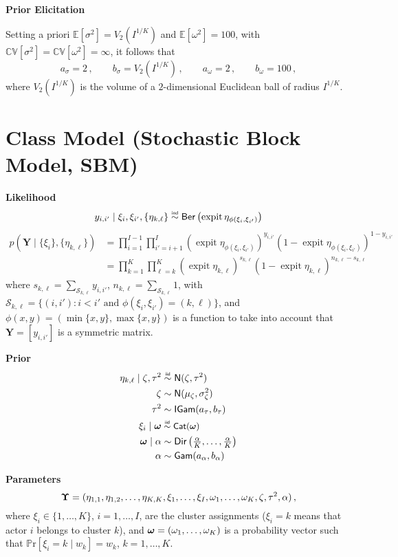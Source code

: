 \documentclass[letterpaper,12pt,openany]{article}
\DeclareMathOperator*{\expit}{expit}
\newcommand\simiid{\mathrel{\overset{\makebox[0pt]{\mbox{\normalfont\tiny\sffamily iid}}}{\sim}}}
\newcommand\simind{\mathrel{\overset{\makebox[0pt]{\mbox{\normalfont\tiny\sffamily ind}}}{\sim}}}
\newcommand{\pr}[1]{\mathbb{P}\text{r}\left[#1\right]}
\newcommand{\expec}[1]{\mathbb{E}\left[#1\right]}
\newcommand{\CV}[1]{\mathbb{C}\mathbb{V}\left[#1\right]}
\def\Cat{\small{\mathsf{Cat}}}
\def\Dir{\small{\mathsf{Dir}}}
\def\Ber{\small{\mathsf{Ber}}}
\def\Nor{\small{\mathsf{N}}}
\def\Gamd{\small{\mathsf{Gam}}}
\def\IGamd{\small{\mathsf{IGam}}}
\def\Y{\mathbf{Y}}\def\y{\mathbf{y}}\def\Yv{\boldsymbol{Y}}\def\yv{\boldsymbol{y}}
\def\al{\alpha}\def\alv{\boldsymbol{\alpha}}
\def\sig{\sigma}\def\sigv{\boldsymbol{\sigma}}
\def\ome{\omega}
\begin{document}
\textbf{Prior Elicitation}

Setting a priori $\expec{\sigma^2} = V_2\left(I^{1/K}\right)$ and $\expec{\omega^2} = 100$, with $\CV{\sigma^2} = \CV{\omega^2} = \infty$, it follows that
$$
a_\sig = 2\,,\qquad b_\sig = V_2\left(I^{1/K}\right)  \,,\qquad a_\ome =2\,,\qquad b_\ome = 100\,,
$$
where $V_2(I^{1/K})$ is the volume of a $2$-dimensional Euclidean ball of radius $I^{1/K}$.
 
\section{Class Model (Stochastic Block Model, SBM)}

\textbf{Likelihood}
$$y_{i,i'}\mid \xi_i,\xi_{i'}, \{\eta_{k,\ell}\} \simind \Ber\left( \expit\eta_{\phi(\xi_i,\xi_{i'})}  \right)$$
\begin{align*}
p(\Y\mid\{\xi_{i}\},\{\eta_{k,\ell}\}) &= \prod_{i=1}^{I-1}\prod_{i'=i+1}^I(\expit \eta_{\phi(\xi_i,\xi_{i'})})^{y_{i,i'}}(1-\expit \eta_{\phi(\xi_i,\xi_{i'})})^{1-y_{i,i'}} \\
&=\prod_{k=1}^{K}\prod_{\ell=k}^K (\expit \eta_{k,\ell})^{s_{k,\ell}}(1-\expit \eta_{k,\ell})^{n_{k,\ell}-s_{k,\ell}}
\end{align*}
where $s_{k,\ell} = \sum_{\mathcal{S}_{k,\ell}} y_{i,i'}$, $n_{k,\ell} = \sum_{\mathcal{S}_{k,\ell}} 1$, with $\mathcal{S}_{k,\ell} = \{(i,i'):i<i'\text{ and }\phi(\xi_i,\xi_{i'})=(k,\ell)\}$, and $\phi(x,y)=(\min\{x,y\},\max\{x,y\})$ is a function to take into account that $\Y = [y_{i,i'}]$ is a symmetric matrix.

\textbf{Prior}
\begin{align*}
\eta_{k,\ell}\mid\zeta,\tau^2 &\simiid \Nor(\zeta,\tau^2) \\
\zeta &\sim \Nor(\mu_\zeta,\sigma^2_\zeta) \\
\tau^2 &\sim \IGamd(a_\tau,b_\tau) \\
\xi_i\mid\omev &\simiid \Cat(\omev) \\
\omev\mid\al &\sim \Dir\left(\tfrac{\al}{K},\ldots,\tfrac{\al}{K}\right) \\
\al &\sim \Gamd(a_\al,b_\al)
\end{align*}

\textbf{Parameters}
$$\mathbf{\Upsilon}=(\eta_{1,1},\eta_{1,2},\ldots,\eta_{K,K}, \xi_1,\ldots,\xi_I,\omega_1,\ldots,\omega_K,\zeta,\tau^2,\alpha)\,,$$
where $\xi_i\in\{1,\ldots,K\}$, $i=1,\ldots,I$, are the cluster assignments ($\xi_i=k$ means that actor $i$ belongs to cluster $k$), and $\omev=(\ome_1,\ldots,\ome_K)$ is a probability vector such that $\pr{\xi_i=k\mid w_k} = w_k$, $k=1,\ldots,K$.
\end{document}

